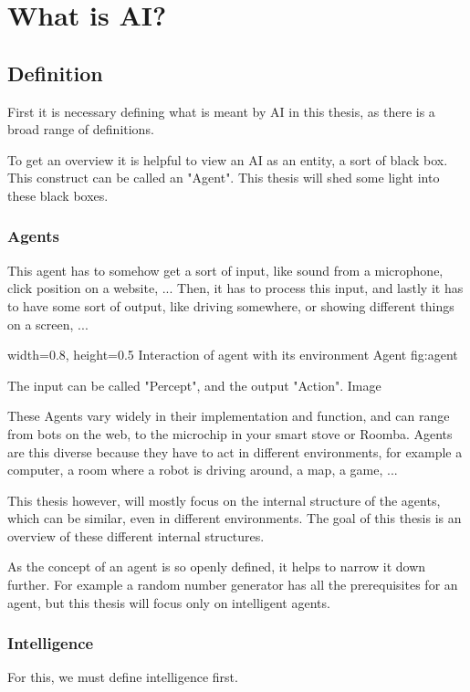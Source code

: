 \chapter{What is AI?}
\section{Definition}
First it is necessary defining what is meant by AI in this thesis, as there is a broad range of definitions.%

To get an overview it is helpful to view an AI as an entity, a sort of black box. This construct can be called an "Agent". 
This thesis will shed some light into these black boxes.

\subsection{Agents}
This agent has to somehow get a sort of input, like sound from a microphone, click position on a website, ... 
Then, it has to process this input, 
and lastly it has to have some sort of output, like driving somewhere, or showing different things on a screen, ... 

    {width=0.8\textwidth, height=0.5\textheight} %
    {Interaction of agent with its environment}   %
    {Agent}   %
    {fig:agent}    %

The input can be called "Percept", and the output "Action". %
Image

These Agents vary widely in their implementation and function, and can range from bots on the web, to the microchip in your smart stove or Roomba. 
Agents are this diverse because they have to act in different environments, for example a computer, a room where a robot is driving around, a map, a game, ...

This thesis however, will mostly focus on the internal structure of the agents, which can be similar, even in different environments.
The goal of this thesis is an overview of these different internal structures.

As the concept of an agent is so openly defined, it helps to narrow it down further. For example a random number generator has all the prerequisites for an agent, but this thesis will focus only on intelligent agents.

\subsection{Intelligence}
For this, we must define intelligence first.


